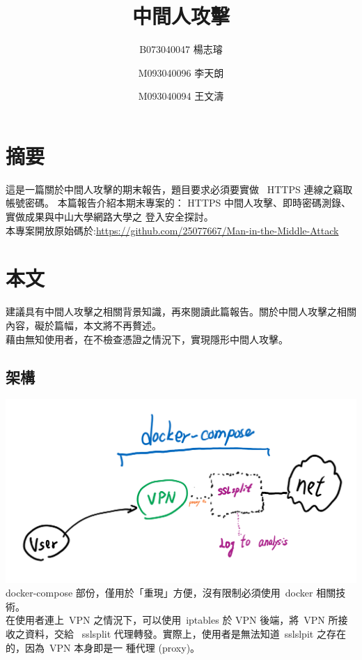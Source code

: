 \documentclass[a4paper]{article}
\title{\textbf{中間人攻擊}}
\author{B073040047 楊志璿 \and M093040096 李天朗 \and M093040094 王文濤}
\begin{document}
\begin{CJK*}{UTF8}{bsmi}
    \maketitle
    \newpage

    \tableofcontents
    \newpage

    \section{摘要}
    這是一篇關於中間人攻擊的期末報告，題目要求必須要實做 \ HTTPS 連線之竊取帳號密碼。
    本篇報告介紹本期末專案的： HTTPS 中間人攻擊、即時密碼測錄、實做成果與中山大學網路大學之
    登入安全探討。\\

    本專案開放原始碼於:\url{https://github.com/25077667/Man-in-the-Middle-Attack}
    \newpage

    \section{本文}
    建議具有中間人攻擊之相關背景知識，再來閱讀此篇報告。關於中間人攻擊之相關內容，礙於篇幅，本文將不再贅述。\\
    藉由無知使用者，在不檢查憑證之情況下，實現隱形中間人攻擊。
    \subsection{架構}
    \includegraphics[width=\textwidth]{images/image_2022-01-14_01-52-22.png}
    docker-compose 部份，僅用於「重現」方便，沒有限制必須使用\ docker 相關技術。\\

    在使用者連上\ VPN 之情況下，可以使用\ iptables 於 VPN 後端，將\ VPN 所接收之資料，交給
    \ sslsplit 代理轉發。實際上，使用者是無法知道\ sslslpit 之存在的，因為\ VPN 本身即是一
    種代理 (proxy)。


\end{CJK*}
\end{document}
